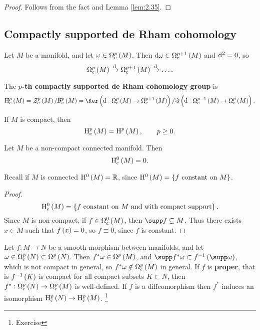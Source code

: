 \begin{proof}
Follows from the fact and Lemma \ref{lem:2.35}.
\end{proof}

\subsection{Compactly supported de Rham cohomology}

Let $ M $ be a manifold, and let $ \omega \in \Omega_\c^p\br{M} $. Then $ \d\omega \in \Omega_\c^{p + 1}\br{M} $ and $ \mathrm{d}^2 = 0 $, so
$$ \Omega_\c^p\br{M} \xrightarrow{\d} \Omega_\c^{p + 1}\br{M} \xrightarrow{\d} \dots. $$

\begin{definition}
The \textbf{$ p $-th compactly supported de Rham cohomology group} is
$$ \H_\c^p\br{M} = \ZZZ_\c^p\br{M} / \BBB_\c^p\br{M} = \Ker \br{\d : \Omega_\c^p\br{M} \to \Omega_\c^{p + 1}\br{M}} / \Im \br{\d : \Omega_\c^{p - 1}\br{M} \to \Omega_\c^p\br{M}}. $$
\end{definition}

\begin{example*}
If $ M $ is compact, then
$$ \H_\c^p\br{M} = \H^p\br{M}, \qquad p \ge 0. $$
\end{example*}

\begin{proposition}
Let $ M $ be a non-compact connected manifold. Then
$$ \H_\c^0\br{M} = 0. $$
\end{proposition}

Recall if $ M $ is connected $ \H^0\br{M} = \RR $, since $ \H^0\br{M} = \cbr{f \ \text{constant on} \ M} $.

\begin{proof}
$$ \H_\c^0\br{M} = \cbr{f \ \text{constant on} \ M \ \text{and with compact support}}. $$
Since $ M $ is non-compact, if $ f \in \Omega_\c^0\br{M} $, then $ \supp f \subsetneq M $. Thus there exists $ x \in M $ such that $ f\br{x} = 0 $, so $ f \equiv 0 $, since $ f $ is constant.
\end{proof}

\begin{remark}
Let $ f : M \to N $ be a smooth morphism between manifolds, and let $ \omega \in \Omega_\c^p\br{N} \subset \Omega^p\br{N} $. Then $ f^*\omega \in \Omega^p\br{M} $, and $ \supp f^*\omega \subset f^{-1}\br{\supp \omega} $, which is not compact in general, so $ f^*\omega \notin \Omega_\c^p\br{M} $ in general. If $ f $ is \textbf{proper}, that is $ f^{-1}\br{K} $ is compact for all compact subsets $ K \subset N $, then $ f^* : \Omega_\c^p\br{N} \to \Omega_\c^p\br{M} $ is well-defined. If $ f $ is a diffeomorphism then $ f^* $ induces an isomorphism $ \H_\c^p\br{N} \to \H_\c^p\br{M} $. \footnote{Exercise}
\end{remark}

